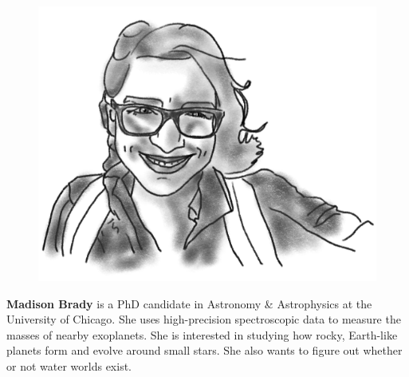 \begin{figure}
\vspace{-\intextsep}
\includegraphics[width=0.9\linewidth]{portraits/madison.png}
\end{figure}
\textbf{Madison Brady} is a PhD candidate in Astronomy \& Astrophysics at the University of Chicago.  She uses high-precision spectroscopic data to measure the masses of nearby exoplanets.  She is interested in studying how rocky, Earth-like planets form and evolve around small stars.  She also wants to figure out whether or not water worlds exist.\\
\\

